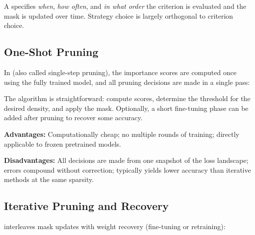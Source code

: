 A  specifies \emph{when}, \emph{how often}, and
\emph{in what order} the criterion is evaluated and the mask is updated over
time.  Strategy choice is largely orthogonal to criterion choice.

\subsection{One-Shot Pruning}

In  (also called single-step pruning), the importance
scores are computed once using the fully trained model, and all pruning
decisions are made in a single pass:


The algorithm is straightforward: compute scores, determine the threshold for the desired density, and apply the mask.  Optionally, a short fine-tuning phase can be added after pruning to recover some accuracy.

\textbf{Advantages:}  Computationally cheap; no multiple rounds of
training; directly applicable to frozen pretrained models.

\textbf{Disadvantages:}  All decisions are made from one snapshot of the
loss landscape; errors compound without correction; typically yields lower
accuracy than iterative methods at the same sparsity.

\subsection{Iterative Pruning and Recovery}
\label{subsec:iterative_pruning}

 interleaves mask updates with weight recovery
(fine-tuning or retraining):


